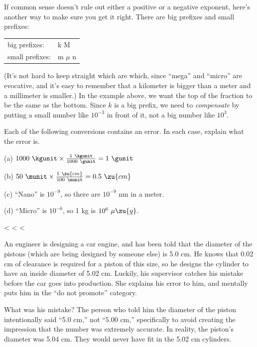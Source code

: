 If common sense doesn't rule out either a positive or a
negative exponent, here's another way to make sure you get
it right. There are big prefixes and small prefixes:

\begin{tabular}{ll}
    big prefixes:    & k \quad    M \\
    small prefixes:  &  m  \quad  $\mu$  \quad   n \\
\end{tabular}

\noindent (It's not hard to keep straight which are which, since
``mega'' and ``micro'' are evocative, and it's easy to
remember that a kilometer is bigger than a meter and a
millimeter is smaller.) In the example above, we want the
top of the fraction to be the same as the bottom. Since $k$
is a big prefix, we need to \emph{compensate} by putting a
small number like $10^{-3}$  in front of it, not a big
number like $10^3$.



\startdq

\begin{dq}
Each of the following conversions contains an error.  In
each case, explain what the error is.

(a) $1000\ \kgunit \times \frac{1\ \kgunit}{1000\ \gunit}  = 1\ \gunit$

(b) $50\ \munit \times \frac{1\ \zu{cm}}{100\ \munit}    =  0.5\ \zu{cm}$

(c) ``Nano'' is $10^{-9}$, so there are $10^{-9}$  nm in a meter.

(d) ``Micro'' is $10^{-6}$, so 1 kg is $10^6\ \mu\zu{g}$.

\end{dq}

<%
<%
<%

An engineer is designing a car engine, and has been told
that the diameter of the pistons (which are being designed
by someone else) is 5.0 cm. He knows that 0.02 cm of clearance
is required for a piston of this size, so he designs the
cylinder to have an inside diameter of 5.02 cm. Luckily, his
supervisor catches his mistake before the car goes into
production. She explains his error to him, and mentally puts
him in the ``do not promote'' category.

What was his mistake? The person who told him the diameter
of the piston intentionally said ``5.0 cm,'' not ``5.00 cm,''
specifically to avoid creating the
impression that the number was extremely accurate. In
reality, the piston's diameter was 5.04 cm. They would never
have fit in the 5.02 cm cylinders.

